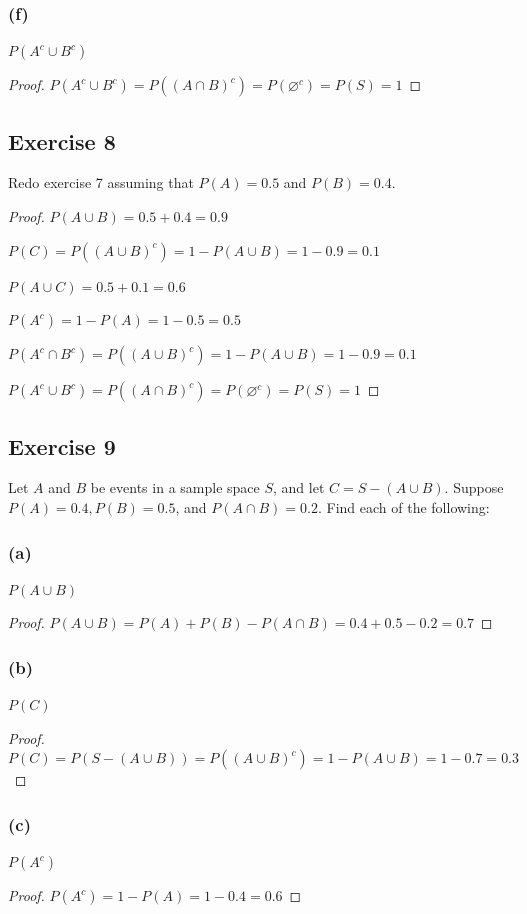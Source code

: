 \documentclass[14pt]{extarticle}
\newcommand{\es}{\varnothing}
\begin{document}
\subsubsection{(f)}
\(P(A^c \cup B^c)\)
\begin{proof}
\(P(A^c \cup B^c) = P((A \cap B)^c) = P(\es^c) = P(S) = 1\)
\end{proof}

\subsection{Exercise 8}
Redo exercise 7 assuming that \(P(A) = 0.5\) and \(P(B) = 0.4\).

\begin{proof}
\(P(A \cup B) = 0.5 + 0.4 = 0.9\)

\(P(C) = P((A \cup B)^c) = 1 - P(A \cup B) = 1 - 0.9 = 0.1\)

\(P(A \cup C) = 0.5 + 0.1 = 0.6\)

\(P(A^c) = 1 - P(A) = 1 - 0.5 = 0.5\)

\(P(A^c \cap B^c) = P((A \cup B)^c) = 1 - P(A \cup B) = 1 - 0.9 = 0.1\)

\(P(A^c \cup B^c) = P((A \cap B)^c) = P(\es^c) = P(S) = 1\)
\end{proof}

\subsection{Exercise 9}
Let \(A\) and \(B\) be events in a sample space \(S\), and let \(C = S - (A \cup B)\). Suppose \(P(A) = 0.4, P(B) = 0.5\), 
and \(P(A \cap B) = 0.2\). Find each of the following:

\subsubsection{(a)}
\(P(A \cup B)\)
\begin{proof}
\(P(A \cup B) = P(A) + P(B) - P(A \cap B) = 0.4 + 0.5 - 0.2 = 0.7\)
\end{proof}

\subsubsection{(b)}
\(P(C)\)
\begin{proof}
\(P(C) = P(S - (A \cup B)) = P((A \cup B)^c) = 1 - P(A \cup B) = 1 - 0.7 = 0.3\)
\end{proof}

\subsubsection{(c)}
\(P(A^c)\)
\begin{proof}
\(P(A^c) = 1 - P(A) = 1 - 0.4 = 0.6\)
\end{proof}
\end{document}
